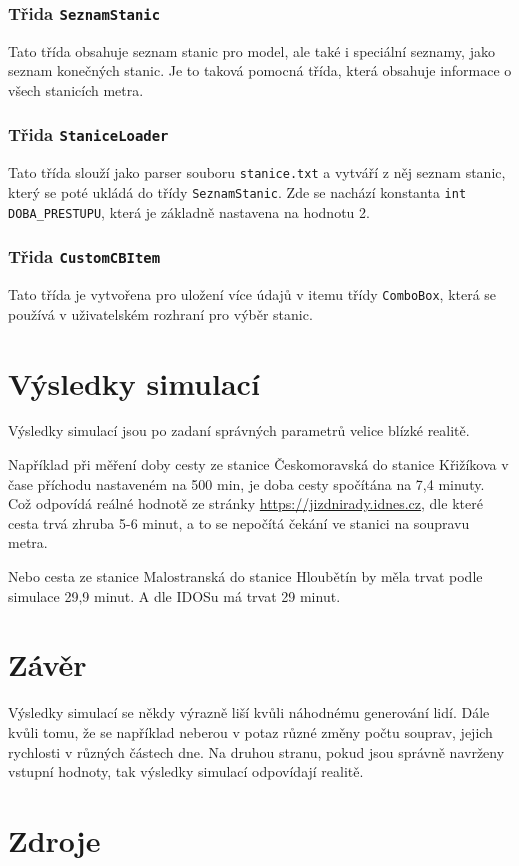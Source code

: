 \documentclass[12pt, a4paper]{article}
\begin{document}
\subsubsection{Třida \texttt{SeznamStanic}}
Tato třída obsahuje seznam stanic pro model, ale také i speciální seznamy, jako seznam konečných stanic. Je to taková pomocná třída, která obsahuje informace o všech stanicích metra.

\subsubsection{Třida \texttt{StaniceLoader}}
Tato třída slouží jako parser souboru \texttt{stanice.txt} a vytváří z něj seznam stanic, který se poté ukládá do třídy \texttt{SeznamStanic}. Zde se nachází konstanta \texttt{int DOBA\_PRESTUPU}, která je základně nastavena na hodnotu 2.

\subsubsection{Třida \texttt{CustomCBItem}}
Tato třída je vytvořena pro uložení více údajů v itemu třídy \texttt{ComboBox}, která se používá v uživatelském rozhraní pro výběr stanic.

\section{Výsledky simulací}
Výsledky simulací jsou po zadaní správných parametrů velice blízké realitě. 

Například při měření doby cesty ze stanice Českomoravská do stanice Křižíkova v čase příchodu nastaveném na 500 min, je doba cesty spočítána na 7,4 minuty. Což odpovídá reálné hodnotě ze stránky \url{https://jizdnirady.idnes.cz}, dle které cesta trvá zhruba 5-6 minut, a to se nepočítá čekání ve stanici na soupravu metra.

Nebo cesta ze stanice Malostranská do stanice Hloubětín by měla trvat podle simulace 29,9 minut. A dle IDOSu má trvat 29 minut.
\section{Závěr}
Výsledky simulací se někdy výrazně liší kvůli náhodnému generování lidí. Dále kvůli tomu, že se například neberou v potaz různé změny počtu souprav, jejich rychlosti v různých částech dne.
Na druhou stranu, pokud jsou správně navrženy vstupní hodnoty, tak výsledky simulací odpovídají realitě.
\section{Zdroje}
\nocite{*}
\printbibliography[heading=none]
\end{document}
